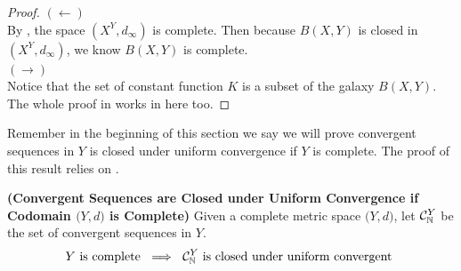 \documentclass{report}
\begin{document}
\begin{proof}
$(\longleftarrow)$\\

By , the space $(X^Y, d_{\infty})$ is complete. Then because $B(X,Y)$ is closed in $(X^Y,d_\infty)$, we know $B(X,Y)$ is complete.\\

$(\longrightarrow)$\\

Notice that the set of constant function $K$ is a subset of the galaxy  $B(X,Y)$. The whole proof in  works in here too. 
\end{proof}
\begin{mdframed}
Remember in the beginning of this section we say we will prove convergent sequences in $Y$ is closed under uniform convergence if $Y$ is complete. The proof of this result relies on .
\end{mdframed}
\begin{theorem}
\label{CSaC}
\textbf{(Convergent Sequences are Closed under Uniform Convergence if Codomain $\big(Y,d\big)$ is Complete)} Given a complete metric space $\big(Y,d\big)$, let $\mathcal{C}_{\mathbb{N}}^Y$ be the set of convergent sequences in $Y$.
\begin{align*}
Y\text{ is complete }\implies \text{ $\mathcal{C}_{\mathbb{N}}^Y$ is closed under uniform convergent }
\end{align*}
\end{theorem}
\end{document}
